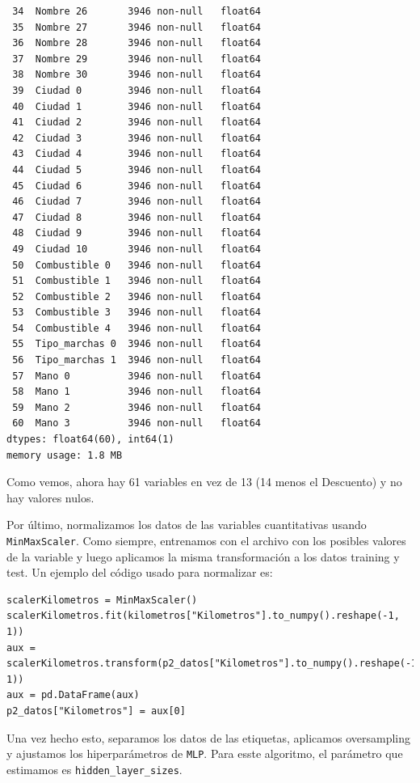 \documentclass[a4]{article}
\begin{document}
\begin{verbatim}
 34  Nombre 26       3946 non-null   float64
 35  Nombre 27       3946 non-null   float64
 36  Nombre 28       3946 non-null   float64
 37  Nombre 29       3946 non-null   float64
 38  Nombre 30       3946 non-null   float64
 39  Ciudad 0        3946 non-null   float64
 40  Ciudad 1        3946 non-null   float64
 41  Ciudad 2        3946 non-null   float64
 42  Ciudad 3        3946 non-null   float64
 43  Ciudad 4        3946 non-null   float64
 44  Ciudad 5        3946 non-null   float64
 45  Ciudad 6        3946 non-null   float64
 46  Ciudad 7        3946 non-null   float64
 47  Ciudad 8        3946 non-null   float64
 48  Ciudad 9        3946 non-null   float64
 49  Ciudad 10       3946 non-null   float64
 50  Combustible 0   3946 non-null   float64
 51  Combustible 1   3946 non-null   float64
 52  Combustible 2   3946 non-null   float64
 53  Combustible 3   3946 non-null   float64
 54  Combustible 4   3946 non-null   float64
 55  Tipo_marchas 0  3946 non-null   float64
 56  Tipo_marchas 1  3946 non-null   float64
 57  Mano 0          3946 non-null   float64
 58  Mano 1          3946 non-null   float64
 59  Mano 2          3946 non-null   float64
 60  Mano 3          3946 non-null   float64
dtypes: float64(60), int64(1)
memory usage: 1.8 MB
\end{verbatim}

Como vemos, ahora hay 61 variables en vez de 13 (14 menos el Descuento) y no hay valores nulos.

Por último, normalizamos los datos de las variables cuantitativas usando \texttt{MinMaxScaler}. Como siempre, entrenamos con el archivo con los posibles valores de la variable y luego aplicamos la misma transformación a los datos training y test. Un  ejemplo del código usado para normalizar es:

\begin{lstlisting}
scalerKilometros = MinMaxScaler()
scalerKilometros.fit(kilometros["Kilometros"].to_numpy().reshape(-1, 1))
aux = scalerKilometros.transform(p2_datos["Kilometros"].to_numpy().reshape(-1, 1))
aux = pd.DataFrame(aux)
p2_datos["Kilometros"] = aux[0]
\end{lstlisting}

Una vez hecho esto, separamos los datos de las etiquetas, aplicamos oversampling y ajustamos los hiperparámetros de \texttt{MLP}. Para esste algoritmo, el parámetro que estimamos es \texttt{hidden\_layer\_sizes}.

\begin{figure}[H]
  \centering
\end{figure}
\end{document}
